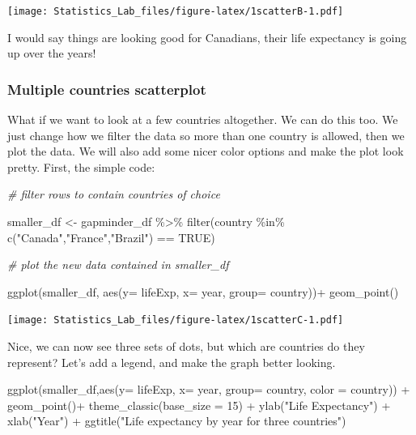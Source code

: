 \documentclass[
]{book}
\newenvironment{Shaded}{\begin{snugshade}}{\end{snugshade}}
\newcommand{\AttributeTok}[1]{\textcolor[rgb]{0.77,0.63,0.00}{#1}}
\newcommand{\CommentTok}[1]{\textcolor[rgb]{0.56,0.35,0.01}{\textit{#1}}}
\newcommand{\ConstantTok}[1]{\textcolor[rgb]{0.00,0.00,0.00}{#1}}
\newcommand{\DecValTok}[1]{\textcolor[rgb]{0.00,0.00,0.81}{#1}}
\newcommand{\FunctionTok}[1]{\textcolor[rgb]{0.00,0.00,0.00}{#1}}
\newcommand{\NormalTok}[1]{#1}
\newcommand{\OtherTok}[1]{\textcolor[rgb]{0.56,0.35,0.01}{#1}}
\newcommand{\SpecialCharTok}[1]{\textcolor[rgb]{0.00,0.00,0.00}{#1}}
\newcommand{\StringTok}[1]{\textcolor[rgb]{0.31,0.60,0.02}{#1}}
\begin{document}
\texttt{[image: Statistics\_Lab\_files/figure-latex/1scatterB-1.pdf]}

I would say things are looking good for Canadians, their life expectancy is going up over the years!

\hypertarget{multiple-countries-scatterplot}{%
\subsubsection{Multiple countries scatterplot}\label{multiple-countries-scatterplot}}

What if we want to look at a few countries altogether. We can do this too. We just change how we filter the data so more than one country is allowed, then we plot the data. We will also add some nicer color options and make the plot look pretty. First, the simple code:

\begin{Shaded}
\begin{Highlighting}[]
\CommentTok{\# filter rows to contain countries of choice}

\NormalTok{smaller\_df }\OtherTok{\textless{}{-}}\NormalTok{ gapminder\_df }\SpecialCharTok{\%\textgreater{}\%} 
                 \FunctionTok{filter}\NormalTok{(country }\SpecialCharTok{\%in\%} \FunctionTok{c}\NormalTok{(}\StringTok{"Canada"}\NormalTok{,}\StringTok{"France"}\NormalTok{,}\StringTok{"Brazil"}\NormalTok{) }\SpecialCharTok{==} \ConstantTok{TRUE}\NormalTok{)}

\CommentTok{\# plot the new data contained in smaller\_df}

\FunctionTok{ggplot}\NormalTok{(smaller\_df, }\FunctionTok{aes}\NormalTok{(}\AttributeTok{y=}\NormalTok{ lifeExp, }\AttributeTok{x=}\NormalTok{ year, }\AttributeTok{group=}\NormalTok{ country))}\SpecialCharTok{+}
  \FunctionTok{geom\_point}\NormalTok{()}
\end{Highlighting}
\end{Shaded}

\texttt{[image: Statistics\_Lab\_files/figure-latex/1scatterC-1.pdf]}

Nice, we can now see three sets of dots, but which are countries do they represent? Let's add a legend, and make the graph better looking.

\begin{Shaded}
\begin{Highlighting}[]
\FunctionTok{ggplot}\NormalTok{(smaller\_df,}\FunctionTok{aes}\NormalTok{(}\AttributeTok{y=}\NormalTok{ lifeExp, }\AttributeTok{x=}\NormalTok{ year, }
                      \AttributeTok{group=}\NormalTok{ country, }\AttributeTok{color =}\NormalTok{ country)) }\SpecialCharTok{+}
  \FunctionTok{geom\_point}\NormalTok{()}\SpecialCharTok{+} 
  \FunctionTok{theme\_classic}\NormalTok{(}\AttributeTok{base\_size =} \DecValTok{15}\NormalTok{) }\SpecialCharTok{+}
  \FunctionTok{ylab}\NormalTok{(}\StringTok{"Life Expectancy"}\NormalTok{) }\SpecialCharTok{+} 
  \FunctionTok{xlab}\NormalTok{(}\StringTok{"Year"}\NormalTok{) }\SpecialCharTok{+}
  \FunctionTok{ggtitle}\NormalTok{(}\StringTok{"Life expectancy by year for three countries"}\NormalTok{)}
\end{Highlighting}
\end{Shaded}
\end{document}
